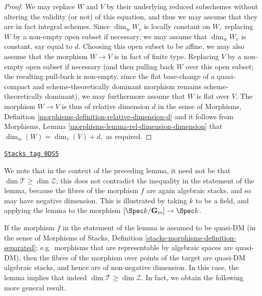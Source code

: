 \begin{proof}
\medskip\noindent
We may replace $W$ and $V$ by their underlying reduced subschemes
without altering the validity (or not) of this equation,
and thus we may assume that they are in fact integral schemes.
Since $\dim_w W_v$ is locally constant on $W,$ replacing $W$
by a non-empty open subset if necessary, we may assume that $\dim_w W_v$
is constant, say equal to $d$.  Choosing this open subset to be affine,
we may also assume that the morphism $W\to V$ is in fact of finite type.
Replacing $V$ by a non-empty open subset if necessary
(and then pulling back $W$ over this open subset; the resulting pull-back
is non-empty, since the flat base-change of a quasi-compact
and scheme-theoretically
dominant morphism remains scheme-theoretically dominant),
we may furthermore assume that $W$ is flat over $V$.
The morphism $W\to V$ is thus of relative dimension $d$
in the sense of
Morphisms, Definition
\ref{morphisms-definition-relative-dimension-d}
and it follows from
Morphisms, Lemma \ref{morphisms-lemma-rel-dimension-dimension}
that $\dim_w(W) = \dim_v(V) + d,$ as required.
\end{proof}

\begin{remark}
\label{stacks-geometry-remark-negative-dimension}
\href{https://stacks.math.columbia.edu/tag/0DS5}{\texttt{Stacks tag 0DS5}}

We note that in the context of the preceding lemma,
it need not be that $\dim \mathcal{T} \geq \dim \mathcal{Z}$; this does
not contradict the inequality in the statement of the lemma, because
the fibres of the morphism $f$ are again algebraic stacks, and
so may have negative dimension.  This is illustrated by taking
$k$ to be a field, and applying the lemma to the morphism
$[\Spec k/\mathbf{G}_m] \to \Spec k$.

\medskip\noindent
If the morphism $f$ in the statement of the lemma is assumed
to be quasi-DM (in the sense of
Morphisms of Stacks, Definition
\ref{stacks-morphisms-definition-separated}; e.g.\ morphisms that are
representable by algebraic spaces are quasi-DM),
then the fibres of the morphism over points of the target
are quasi-DM algebraic stacks, and hence are of non-negative
dimension.  In this case, the lemma implies
that indeed $\dim \mathcal{T} \geq \dim \mathcal{Z}$.  In fact, we obtain
the following more general result.
\end{remark}


